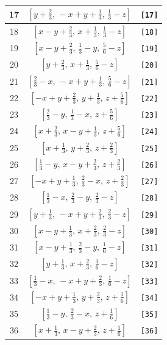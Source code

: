 \documentclass[fleqn,8pt]{jsarticle}
\begin{document}
\begin{longtable}{ccc}
17 & $\left[ y + \frac{2}{3},\, - x + y + \frac{1}{3},\, \frac{1}{3} - z \right]$ & {\tt [17]} \\ \hline
18 & $\left[ x - y + \frac{2}{3},\, x + \frac{1}{3},\, \frac{1}{3} - z \right]$ & {\tt [18]} \\ \hline
19 & $\left[ x - y + \frac{2}{3},\, \frac{1}{3} - y,\, \frac{5}{6} - z \right]$ & {\tt [19]} \\ \hline
20 & $\left[ y + \frac{2}{3},\, x + \frac{1}{3},\, \frac{5}{6} - z \right]$ & {\tt [20]} \\ \hline
21 & $\left[ \frac{2}{3} - x,\, - x + y + \frac{1}{3},\, \frac{5}{6} - z \right]$ & {\tt [21]} \\ \hline
22 & $\left[ - x + y + \frac{2}{3},\, y + \frac{1}{3},\, z + \frac{5}{6} \right]$ & {\tt [22]} \\ \hline
23 & $\left[ \frac{2}{3} - y,\, \frac{1}{3} - x,\, z + \frac{5}{6} \right]$ & {\tt [23]} \\ \hline
24 & $\left[ x + \frac{2}{3},\, x - y + \frac{1}{3},\, z + \frac{5}{6} \right]$ & {\tt [24]} \\ \hline
25 & $\left[ x + \frac{1}{3},\, y + \frac{2}{3},\, z + \frac{2}{3} \right]$ & {\tt [25]} \\ \hline
26 & $\left[ \frac{1}{3} - y,\, x - y + \frac{2}{3},\, z + \frac{2}{3} \right]$ & {\tt [26]} \\ \hline
27 & $\left[ - x + y + \frac{1}{3},\, \frac{2}{3} - x,\, z + \frac{2}{3} \right]$ & {\tt [27]} \\ \hline
28 & $\left[ \frac{1}{3} - x,\, \frac{2}{3} - y,\, \frac{2}{3} - z \right]$ & {\tt [28]} \\ \hline
29 & $\left[ y + \frac{1}{3},\, - x + y + \frac{2}{3},\, \frac{2}{3} - z \right]$ & {\tt [29]} \\ \hline
30 & $\left[ x - y + \frac{1}{3},\, x + \frac{2}{3},\, \frac{2}{3} - z \right]$ & {\tt [30]} \\ \hline
31 & $\left[ x - y + \frac{1}{3},\, \frac{2}{3} - y,\, \frac{1}{6} - z \right]$ & {\tt [31]} \\ \hline
32 & $\left[ y + \frac{1}{3},\, x + \frac{2}{3},\, \frac{1}{6} - z \right]$ & {\tt [32]} \\ \hline
33 & $\left[ \frac{1}{3} - x,\, - x + y + \frac{2}{3},\, \frac{1}{6} - z \right]$ & {\tt [33]} \\ \hline
34 & $\left[ - x + y + \frac{1}{3},\, y + \frac{2}{3},\, z + \frac{1}{6} \right]$ & {\tt [34]} \\ \hline
35 & $\left[ \frac{1}{3} - y,\, \frac{2}{3} - x,\, z + \frac{1}{6} \right]$ & {\tt [35]} \\ \hline
36 & $\left[ x + \frac{1}{3},\, x - y + \frac{2}{3},\, z + \frac{1}{6} \right]$ & {\tt [36]} \\
\end{longtable}
\end{document}
